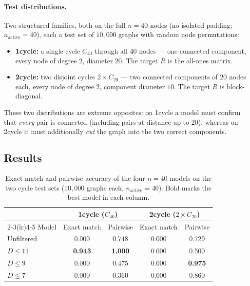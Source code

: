 \documentclass[11pt,a4paper]{article}
\begin{document}
\paragraph{Test distributions.} Two structured families, both on the full
$n = 40$ nodes (no isolated padding; $n_{\text{active}} = 40$), each a test set
of $10{,}000$ graphs with random node permutations:
\begin{itemize}
    \item \textbf{1cycle:} a single cycle $C_{40}$ through all $40$ nodes ---
          one connected component, every node of degree $2$, diameter $20$.
          The target $R$ is the all-ones matrix.
    \item \textbf{2cycle:} two disjoint cycles $2 \times C_{20}$ --- two
          connected components of $20$ nodes each, every node of degree $2$,
          component diameter $10$. The target $R$ is block-diagonal.
\end{itemize}
These two distributions are extreme opposites: on 1cycle a model must confirm
that \emph{every} pair is connected (including pairs at distance up to $20$),
whereas on 2cycle it must additionally \emph{cut} the graph into the two
correct components.

\subsection{Results}

\begin{table}[H]
\centering
\begin{tabular}{lcccc}
\toprule
 & \multicolumn{2}{c}{1cycle ($C_{40}$)} & \multicolumn{2}{c}{2cycle ($2\times C_{20}$)} \\
\cmidrule(lr){2-3}\cmidrule(lr){4-5}
Model & Exact match & Pairwise & Exact match & Pairwise \\
\midrule
Unfiltered & 0.000 & 0.748 & 0.000 & 0.729 \\
$D \le 11$ & \textbf{0.943} & \textbf{1.000} & 0.000 & 0.500 \\
$D \le 9$  & 0.000 & 0.475 & 0.000 & \textbf{0.975} \\
$D \le 7$  & 0.000 & 0.360 & 0.000 & 0.860 \\
\bottomrule
\end{tabular}
\caption{Exact-match and pairwise accuracy of the four $n = 40$ models on the
two cycle test sets ($10{,}000$ graphs each, $n_{\text{active}} = 40$). Bold
marks the best model in each column.}
\label{tab:cycles}
\end{table}
\end{document}
